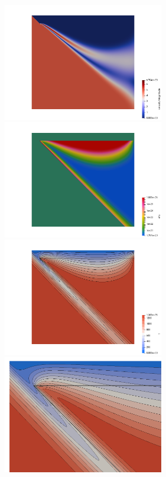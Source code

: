\begin{center}
\includegraphics[width=7cm]{python_codes/fieldstone_68/results/case2a/vel}
\includegraphics[width=7cm]{python_codes/fieldstone_68/results/case2a/eta}\\
\includegraphics[width=7cm]{python_codes/fieldstone_68/results/case2a/T}
\includegraphics[width=7cm]{python_codes/fieldstone_68/results/case2a/T_zoom}
\end{center}

